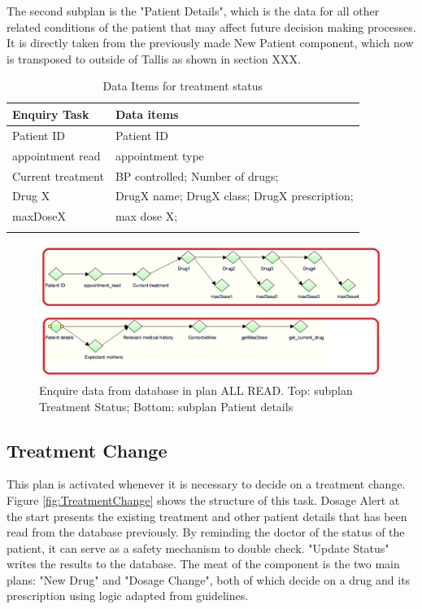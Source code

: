 \documentclass[11pt]{article}
\begin{document}
The second subplan is the "Patient Details", which is the data for all other related conditions of the patient that may affect future decision making processes.  It is directly taken from the previously made New Patient component, which now is transposed to outside of Tallis as shown in section XXX.
\begin {table}[ht]
\caption {Data Items for treatment status}
\begin{center}
\begin{tabular}{|p{3cm}|p{15cm}|}
\hline
\textbf{Enquiry Task} & \textbf{Data items}                                                                                                                                         \\ \hline
Patient ID & Patient ID \\ \hline
appointment read& appointment type\\ \hline
Current treatment &BP controlled; Number of drugs;\\ \hline
Drug X & DrugX name; DrugX class; DrugX prescription;\\ \hline
maxDoseX & max dose X;\\ \hline
\label{table:treatmentstatus}

\end{tabular}
\end{center}
\end{table}


\begin{figure}[ht]
\begin{center}
\includegraphics[scale=0.7]{tallisRead}
\caption{Enquire data from database in plan ALL READ. Top: subplan Treatment Status; Bottom: subplan Patient details}
\label{fig:tallisRead}
\end{center}
\end{figure}

\subsection{Treatment Change}
This plan is activated whenever it is necessary to decide on a treatment change.  Figure \ref{fig:TreatmentChange} shows the structure of this task.   Dosage Alert at the start presents the existing treatment and other patient details that has been read from the database previously.  By reminding the doctor of the status of the patient, it can serve as a safety mechanism to double check.    "Update Status" writes the results to the database.  The meat of the component is the two main plans: "New Drug" and "Dosage Change", both of which decide on a drug and its prescription using logic adapted from guidelines.
\end{document}

